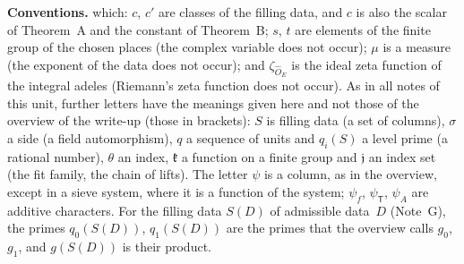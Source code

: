 \documentclass[11pt,a4paper]{article}
\newcommand{\m}[1]{\mbox{$#1$}}        %
\theoremstyle{plainx}
\theoremstyle{uprightx}
\newenvironment{conventions}{\par\addvspace{5pt}\noindent\textbf{Conventions.}\enspace\ignorespaces}{\par\addvspace{3pt}}
\newcommand{\sT}{\mathsf{T}}                        %
\newcommand{\hO}{\hat{O}_E}
\newcommand{\qS}[2]{q_{#2}(#1)}                     %
\newcommand{\gS}[1]{g(#1)}                          %
\newcommand{\SD}[1]{S(#1)}                          %
\begin{document}
\begin{conventions}
which: $c$, $c'$ are classes of the filling data, and $c$ is also the scalar of Theorem~A and the constant of
Theorem~B; $s$, $t$ are elements of the finite group of the chosen places (the complex variable does not occur);
$\mu$ is a measure (the exponent of the data does not occur); and \m{\zeta_{\hO}} is the ideal zeta function of
the integral adeles (Riemann's zeta function does not occur). As in all notes of this unit, further letters have
the meanings given here and not those of the overview of the write-up (those in brackets): $S$ is filling data
(a set of columns), $\sigma$ a side (a field automorphism), $q$ a sequence of units and \m{\qS{S}{i}} a level prime
(a rational number), $\theta$ an index, $\mathfrak{k}$ a function on a finite group and $\mathfrak{j}$ an index set (the fit
family, the chain of lifts). The letter $\psi$ is a column, as in the overview, except in a sieve system, where it
is a function of the system; $\psi_f$, $\psi_{\sT}$, $\psi_A$ are additive characters. For the filling data
\m{\SD{D}} of admissible data~$D$ (Note~G), the primes \m{\qS{\SD{D}}{0}}, \m{\qS{\SD{D}}{1}} are the primes that the
overview calls $g_0$, $g_1$, and \m{\gS{\SD{D}}} is their product.
\end{conventions}
\end{document}

